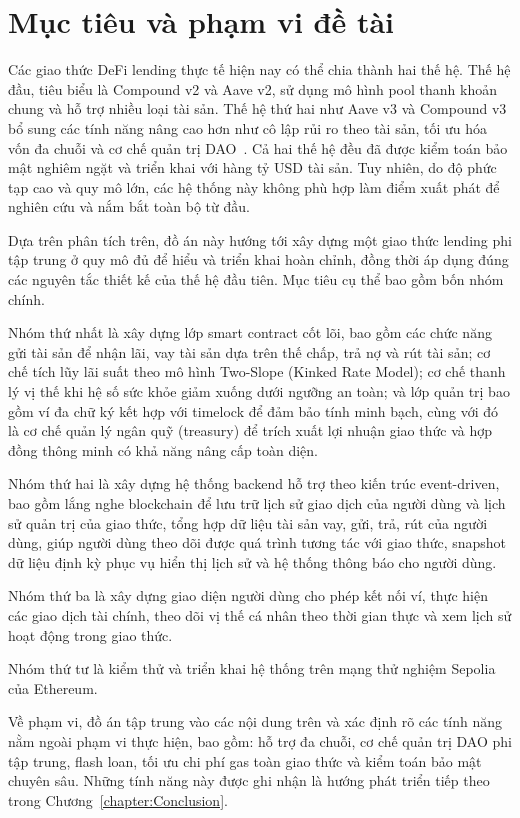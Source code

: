 \documentclass[../DoAn.tex]{subfiles}
\begin{document}
\section{Mục tiêu và phạm vi đề tài}
\label{section:1.2}

Các giao thức DeFi lending thực tế hiện nay có thể chia thành hai thế hệ. Thế hệ đầu, tiêu biểu là Compound v2 và Aave v2, sử dụng mô hình pool thanh khoản chung và hỗ trợ nhiều loại tài sản. Thế hệ thứ hai như Aave v3 và Compound v3 bổ sung các tính năng nâng cao hơn như cô lập rủi ro theo tài sản, tối ưu hóa vốn đa chuỗi và cơ chế quản trị DAO~\cite{CompoundV2Docs,AaveV2Whitepaper,AaveV3TechPaper,CompoundIIIDocs}. Cả hai thế hệ đều đã được kiểm toán bảo mật nghiêm ngặt và triển khai với hàng tỷ USD tài sản. Tuy nhiên, do độ phức tạp cao và quy mô lớn, các hệ thống này không phù hợp làm điểm xuất phát để nghiên cứu và nắm bắt toàn bộ từ đầu.

Dựa trên phân tích trên, đồ án này hướng tới xây dựng một giao thức lending phi tập trung ở quy mô đủ để hiểu và triển khai hoàn chỉnh, đồng thời áp dụng đúng các nguyên tắc thiết kế của thế hệ đầu tiên. Mục tiêu cụ thể bao gồm bốn nhóm chính.

Nhóm thứ nhất là xây dựng lớp smart contract cốt lõi, bao gồm các chức năng gửi tài sản để nhận lãi, vay tài sản dựa trên thế chấp, trả nợ và rút tài sản; cơ chế tích lũy lãi suất theo mô hình Two-Slope (Kinked Rate Model); cơ chế thanh lý vị thế khi hệ số sức khỏe giảm xuống dưới ngưỡng an toàn; và lớp quản trị bao gồm ví đa chữ ký kết hợp với timelock để đảm bảo tính minh bạch, cùng với đó là cơ chế quản lý ngân quỹ (treasury) để trích xuất lợi nhuận giao thức và hợp đồng thông minh có khả năng nâng cấp toàn diện.

Nhóm thứ hai là xây dựng hệ thống backend hỗ trợ theo kiến trúc event-driven, bao gồm lắng nghe blockchain để lưu trữ lịch sử giao dịch của người dùng và lịch sử quản trị của giao thức, tổng hợp dữ liệu tài sản vay, gửi, trả, rút của người dùng, giúp người dùng theo dõi được quá trình tương tác với giao thức, snapshot dữ liệu định kỳ phục vụ hiển thị lịch sử và hệ thống thông báo cho người dùng.

Nhóm thứ ba là xây dựng giao diện người dùng cho phép kết nối ví, thực hiện các giao dịch tài chính, theo dõi vị thế cá nhân theo thời gian thực và xem lịch sử hoạt động trong giao thức.

Nhóm thứ tư là kiểm thử và triển khai hệ thống trên mạng thử nghiệm Sepolia của Ethereum.

Về phạm vi, đồ án tập trung vào các nội dung trên và xác định rõ các tính năng nằm ngoài phạm vi thực hiện, bao gồm: hỗ trợ đa chuỗi, cơ chế quản trị DAO phi tập trung, flash loan, tối ưu chi phí gas toàn giao thức và kiểm toán bảo mật chuyên sâu. Những tính năng này được ghi nhận là hướng phát triển tiếp theo trong Chương~\ref{chapter:Conclusion}.
\end{document}
